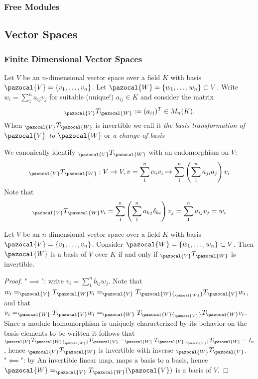\subsubsection{Free Modules}
\subsection{Vector Spaces}
\subsubsection{Finite Dimensional Vector Spaces}
\begin{definition}
    Let $V$ be an $n$-dimensional vector space over a field $K$ with basis $\pazocal{V}=\{v_1,\dots,v_n\}$. Let $\pazocal{W}=\{w_1,\dots,w_n\}\subset V$. Write $w_i = \sum_1^n a_{ij}v_j$ for suitable (unique!) $a_{ij}\in K$ and consider the matrix 
    $$_\pazocal{V}T_\pazocal{W} := (a_{ij})^T\in M_n(K).$$
    When $_\pazocal{V}T_\pazocal{W}$ is invertible we call it \textit{the basis transformation of $\pazocal{V}$ to $\pazocal{W}$} or \textit{a change-of-basis}  
\end{definition}
\begin{remark}
    We canonically identify $_\pazocal{V}T_\pazocal{W}$ with an endomorphism on $V$:
    \begin{gather*}
        _\pazocal{V}T_\pazocal{W} : V\rightarrow V,
        v = \sum_1^n \alpha_i v_i \mapsto \sum_1^n \left(\sum_1^n a_{ji}a_j \right)v_i
    \end{gather*}
    Note that 
    $$_\pazocal{V}T_\pazocal{W} v_i= \sum_1^n\left(\sum_1^n a_{kj}\delta_{ki}\right)v_j = \sum_1^n a_{ij}v_j = w_i $$
\end{remark}
\begin{theorem}\label{BasisTransformationTheorem}
    Let $V$ be an $n$-dimensional vector space over a field $K$ with basis $\pazocal{V}=\{v_1,\dots,v_n\}$. Consider $\pazocal{W}=\{w_1,\dots,w_n\}\subset V$. Then $\pazocal{W}$ is a basis of $V$ over $K$ if and only if $_\pazocal{V}T_\pazocal{W}$ is invertible.  
\end{theorem}
\begin{proof}
    "$\implies$": write $v_i = \sum_1^n b_{ij}w_j$. Note that 
    $w_i = _\pazocal{V}T_\pazocal{W} v_i = _\pazocal{V}T_\pazocal{W} {_\pazocal{W}}T_\pazocal{V} w_i$, and that $v_i = _\pazocal{W}T_\pazocal{V} w_i = _\pazocal{W}T_\pazocal{V} {_\pazocal{V}}T_\pazocal{W} v_i$. Since a module homomorphism is uniquely characterized by its behavior on the basis elements {\Large to be written} it follows that $_\pazocal{V}T_\pazocal{W} {_\pazocal{W}}T_\pazocal{V} = _\pazocal{W}T_\pazocal{V} {_\pazocal{V}}T_\pazocal{W} = I_n$, hence ${_\pazocal{V}}T_\pazocal{W}$ is invertible with inverse ${_\pazocal{W}}T_\pazocal{V}$.\\
    "$\impliedby$": by {\large An invertible linear map, maps a basis to a basis}, hence $\pazocal{W} = _\pazocal{V}T_\pazocal{W}(\pazocal{V})$ is a basis of $V$.
\end{proof}
